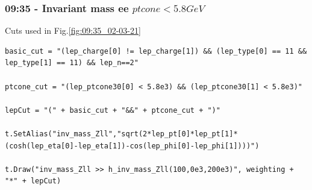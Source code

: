 \subsubsection*{09:35 - Invariant mass ee $ptcone < 5.8 GeV $}
Cuts used in Fig.\ref{fig:09:35_02-03-21}
\begin{lstlisting}
basic_cut = "(lep_charge[0] != lep_charge[1]) && (lep_type[0] == 11 && lep_type[1] == 11) && lep_n==2"

ptcone_cut = "(lep_ptcone30[0] < 5.8e3) && (lep_ptcone30[1] < 5.8e3)"

lepCut = "(" + basic_cut + "&&" + ptcone_cut + ")"

t.SetAlias("inv_mass_Zll","sqrt(2*lep_pt[0]*lep_pt[1]*(cosh(lep_eta[0]-lep_eta[1])-cos(lep_phi[0]-lep_phi[1])))")
  
t.Draw("inv_mass_Zll >> h_inv_mass_Zll(100,0e3,200e3)", weighting + "*" + lepCut)
\end{lstlisting}
